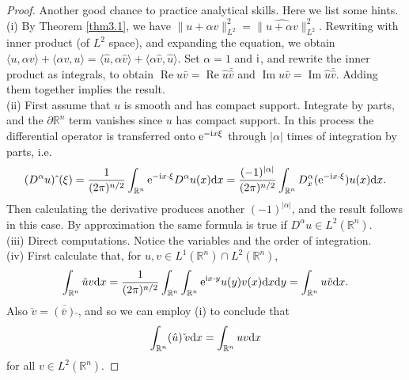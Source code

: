 \documentclass[hyperref,UTF8,12pt]{article}
\numberwithin{equation}{subsection}
\theoremstyle{plain}
\theoremstyle{definition}
\numberwithin{theorem}{section}
\numberwithin{lemma}{section}
\numberwithin{proposition}{section}
\numberwithin{remark}{section}
\numberwithin{corollary}{section}
\numberwithin{definition}{section}
\numberwithin{problem}{section}
\numberwithin{example}{section}
\def\e{\textup{e}}
\def\i{\textup{i}}
\def\dif{\textup{d}}
\newcommand{\ptl}{\partial}
\newcommand{\mr}{\mathbb{R}}
\newcommand{\re}{\operatorname{Re}}
\newcommand{\ima}{\operatorname{Im}}
\begin{document}
\begin{proof}
Another good chance to practice analytical skills. Here we list some hints.\\
(i) By Theorem \ref{thm3.1}, we have $\|u+\alpha v\|_{L^2}^2=\|\widehat{u+\alpha v}\|_{L^2}^2$. Rewriting with inner product (of $L^2$ space), and expanding the equation, we obtain $\langle u,\alpha v\rangle+\langle\alpha v,u\rangle=\langle\hat{u},\alpha\hat{v} \rangle+\langle\alpha\hat{v},\hat{u}\rangle$. Set $\alpha=1$ and $\i$, and rewrite the inner product as integrals, to obtain $\re u\bar{v}=\re\hat{u}\bar{\hat{v}}$ and $\ima u\bar{v} =\ima\hat{u}\bar{\hat{v}}$. Adding them together implies the result.\\
(ii) First assume that $u$ is smooth and has compact support. Integrate by parts, and the $\ptl\mr^n$ term vanishes since $u$ has compact support. In this process the differential operator is transferred onto $\e^{-\i x\xi}$ through $|\alpha|$ times of integration by parts, i.e. \[(D^\alpha u)\,\hat{}\,(\xi)=\frac{1}{(2\pi)^{n/2}}\int_{\mr^n}\e^{-\i x\cdot\xi} D^\alpha u(x)\dif x=\frac{(-1)^{|\alpha|}}{(2\pi)^{n/2}}\int_{\mr^n}D_x^\alpha(\e^{-\i x\cdot\xi})u(x)\dif x.\]Then calculating the derivative produces another $(-1)^{|\alpha|}$, and the result follows in this case. By approximation the same formula is true if $D^\alpha u\in L^2(\mr^n)$.\\
(iii) Direct computations. Notice the variables and the order of integration.\\
(iv) First calculate that, for $u,v\in L^1(\mr^n)\cap L^2(\mr^n)$, \[\int_{\mr^n}\check{u}v\dif x=\frac{1}{(2\pi)^{n/2}}\int_{\mr^n}\int_{\mr^n}\e^{\i x\cdot y}u(y)v(x)\dif x\dif y=\int_{\mr^n}u\check{v}\dif x.\]Also $\check{v}=\overline{(\bar{v})\,\check{}}$, and so we can employ (i) to conclude that \[\int
_{\mr^n}(\hat{u})\,\check{}v\dif x=\int_{\mr^n}uv\dif x\]for all $v\in L^2(\mr^n)$.
\end{proof}
\end{document}
